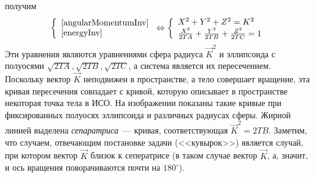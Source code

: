 \documentclass{article}
\newcommand{\degree}{^{\circ}}
\begin{document}
получим
\begin{equation}
\left\{
\begin{array}{l}
\ref{angularMomentumInv}\\
\ref{energyInv}
\end{array}
\right.
\Leftrightarrow
\left\{
\begin{array}{l}
X^2+Y^2+Z^2=K^2\\
\frac{X^2}{2TA}+\frac{Y^2}{2TB}+\frac{Z^2}{2TC}=1
\end{array}
\right.
\end{equation}
Эти уравнения являются уравнениями сфера радиуса \begin{math} \vec{K}^2 \end{math} и эллипсоида с полуосями \begin{math} \sqrt{2TA}, \sqrt{2TB}, \sqrt{2TC} \end{math}, а система является их пересечением. Поскольку вектор \begin{math} \vec{K} \end{math} неподвижен в пространстве, а тело совершает вращение, эта кривая пересечения совпадает с кривой, которую описывает в пространстве некоторая точка тела в ИСО.\newline
На изображении показаны такие кривые при фиксированных полуосях эллипсоида и различных радиусах сферы. Жирной линией выделена {\em сепаратриса}~--- кривая, соответствующая \begin{math} \vec{K}^2=2TB \end{math}. Заметим, что случаем, отвечающим постановке задачи (<<кувырок>>) является случай, при котором вектор \begin{math} \vec{K} \end{math} близок к сеператрисе (в таком случае вектор \begin{math} \vec{K} \end{math}, а, значит, и ось вращения поворачиваются почти на \begin{math} 180\degree \end{math}).
\end{document}
